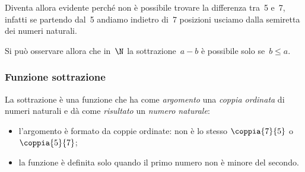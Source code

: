 Diventa allora evidente perché non è possibile trovare la differenza 
tra~5 e~7, infatti se partendo dal~5 andiamo indietro di~7 posizioni 
usciamo dalla semiretta dei numeri naturali.

\begin{inaccessibleblock}

\end{inaccessibleblock}

Si può osservare allora che in~\(\N\) la sottrazione~\(a - b\) è possibile 
solo se~\(b\leq a\).

\subsubsection{Funzione sottrazione}

La sottrazione è una funzione che ha come \emph{argomento} una \emph{coppia 
ordinata} di numeri naturali e dà come \emph{risultato} un \emph{numero 
naturale}:

\vspace{2em}
\begin{minipage}[t]{.48\textwidth}
\begin{center}
\begin{inaccessibleblock}
\end{inaccessibleblock}
\end{center}
\end{minipage}
\hfill
\begin{minipage}[t]{.48\textwidth}
\begin{center}
\begin{inaccessibleblock}
\end{inaccessibleblock}
\end{center}
\end{minipage}

\vspace{-1em}
\begin{osservazione}
\begin{itemize} [nosep]
\item l'argomento è formato da coppie ordinate: non è lo stesso 
\(\coppia{7}{5}\) o \(\coppia{5}{7}\);
\item la funzione è definita solo quando il primo numero non è 
minore del secondo.
\end{itemize}

\end{osservazione}

